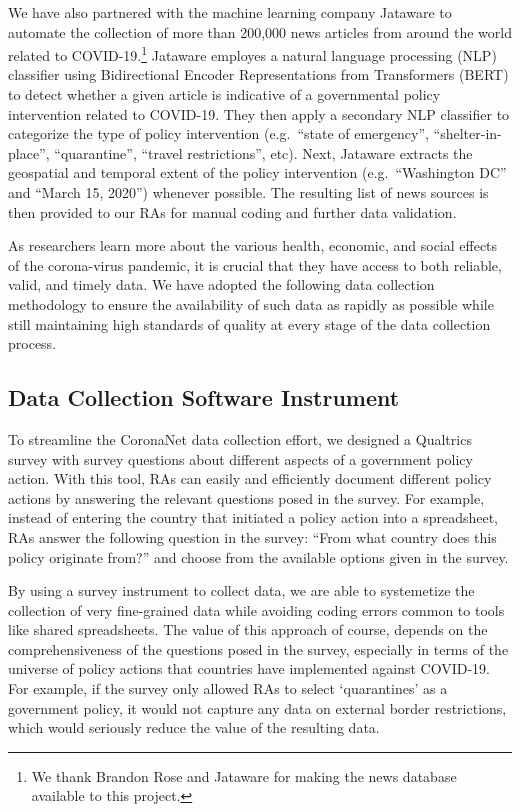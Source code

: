 \documentclass[]{article}
\let\rmarkdownfootnote\footnote%
\def\footnote{\protect\rmarkdownfootnote}
\begin{document}
We have also partnered with the machine learning company Jataware to automate the collection of more than 200,000 news articles from around the world related to COVID-19.\footnote{We thank Brandon Rose and Jataware for making the news database available to this project.} Jataware employes a natural language processing (NLP) classifier using Bidirectional Encoder Representations from Transformers (BERT) to detect whether a given article is indicative of a governmental policy intervention related to COVID-19. They then apply a secondary NLP classifier to categorize the type of policy intervention (e.g.~``state of emergency'', ``shelter-in-place'', ``quarantine'', ``travel restrictions'', etc). Next, Jataware extracts the geospatial and temporal extent of the policy intervention (e.g.~``Washington DC'' and ``March 15, 2020'') whenever possible. The resulting list of news sources is then provided to our RAs for manual coding and further data validation.

As researchers learn more about the various health, economic, and social effects of the corona-virus pandemic, it is crucial that they have access to both reliable, valid, and timely data. We have adopted the following data collection methodology to ensure the availability of such data as rapidly as possible while still maintaining high standards of quality at every stage of the data collection process.

\hypertarget{data-collection-software-instrument}{%
\subsection{Data Collection Software Instrument}\label{data-collection-software-instrument}}

To streamline the CoronaNet data collection effort, we designed a Qualtrics survey with survey questions about different aspects of a government policy action. With this tool, RAs can easily and efficiently document different policy actions by answering the relevant questions posed in the survey. For example, instead of entering the country that initiated a policy action into a spreadsheet, RAs answer the following question in the survey: ``From what country does this policy originate from?'' and choose from the available options given in the survey.

By using a survey instrument to collect data, we are able to systemetize the collection of very fine-grained data while avoiding coding errors common to tools like shared spreadsheets. The value of this approach of course, depends on the comprehensiveness of the questions posed in the survey, especially in terms of the universe of policy actions that countries have implemented against COVID-19. For example, if the survey only allowed RAs to select `quarantines' as a government policy, it would not capture any data on external border restrictions, which would seriously reduce the value of the resulting data.
\end{document}

